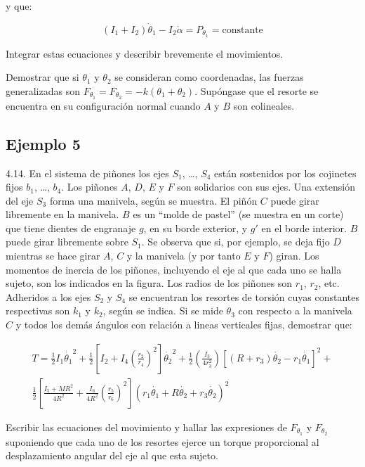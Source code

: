 y que:

\begin{equation*}
    (I_1+I_2)\dot{\theta}_1-I_2\dot{\alpha}=P_{\theta_1}=\text{constante}
\end{equation*}

Integrar estas ecuaciones y describir brevemente el movimientos.

Demostrar que si $\theta_1$ y $\theta_2$ se consideran como coordenadas, las
fuerzas generalizadas son $F_{\theta_1}=F_{\theta_2}=-k(\theta_1+\theta_2)$.
Supóngase que el resorte se encuentra en su configuración normal cuando $A$ y
$B$ son colineales.

\subsection{Ejemplo 5}
4.14. En el sistema de piñones los ejes $S_1$, \ldots, $S_4$ están sostenidos
por los cojinetes fijos $b_1$, \ldots, $b_4$. Los piñones $A$, $D$, $E$ y $F$
son solidarios con sus ejes. Una extensión del eje $S_3$ forma una manivela,
según se muestra. El piñón $C$ puede girar libremente en la manivela. $B$ es un
``molde de pastel'' (se muestra en un corte) que tiene dientes de engranaje $g$,
en su borde exterior, y $g'$ en el borde interior. $B$ puede girar libremente
sobre $S_1$. Se observa que si, por ejemplo, se deja fijo $D$ mientras se hace
girar $A$, $C$ y la manivela (y por tanto $E$ y $F$) giran.
Los momentos de inercia de los piñones, incluyendo el eje al que cada uno se
halla sujeto, son los indicados en la figura. Los radios de los piñones son
$r_1$, $r_2$, etc. Adheridos a los ejes $S_2$ y $S_4$ se encuentran los resortes
de torsión cuyas constantes respectivas son $k_1$ y $k_2$, según se indica. Si
se mide $\theta_3$ con respecto a la manivela $C$ y todos los demás ángulos con
relación a lineas verticales fijas, demostrar que:

\begin{equation*}
\begin{split}
    T=
    \frac{1}{2}I_1\dot{\theta_1}^2+
    \frac{1}{2}\left[
        I_2+
        I_4{\left(
            \frac{r_2}{r_4}
        \right)}^2
    \right]\dot{\theta_2}^2+
    \frac{1}{2}\left(
        \frac{I_3}{4r_3^2}
    \right)
    {[(R+r_3)\dot{\theta_2}-r_1\dot{\theta_1}]}^2+\\
    \frac{1}{2}\left[
        \frac{I_5+MR^2}{4R^2}+
        \frac{I_6}{4R^2}{\left(\frac{r_5}{r_6}\right)}^2
    \right]
    {(r_1\dot{\theta_1}+R\dot{\theta_2}+r_3\dot{\theta_2})}^2
\end{split}
\end{equation*}

Escribir las ecuaciones del movimiento y hallar las expresiones de
$F_{\theta_1}$ y $F_{\theta_2}$ suponiendo que cada uno de los resortes ejerce
un torque proporcional al desplazamiento angular del eje al que esta sujeto.

